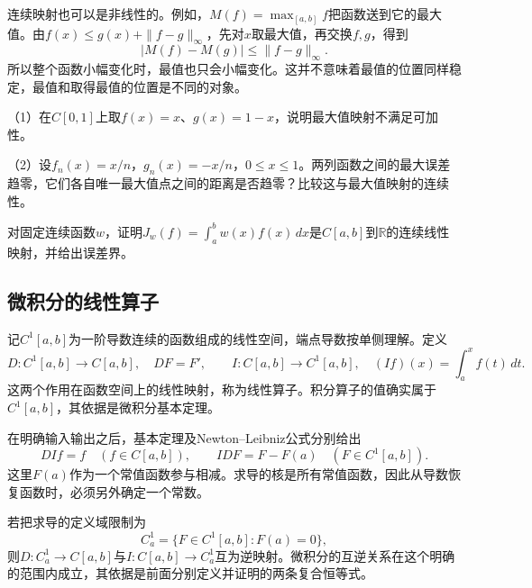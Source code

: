 连续映射也可以是非线性的。例如，\(M(f)=\max_{[a,b]}f\)把函数送到它的最大值。由\(f(x)\le g(x)+\|f-g\|_\infty\)，先对\(x\)取最大值，再交换\(f,g\)，得到
\begin{equation*}
 |M(f)-M(g)|\le\|f-g\|_\infty.
\end{equation*}
所以整个函数小幅变化时，最值也只会小幅变化。这并不意味着最值的位置同样稳定，最值和取得最值的位置是不同的对象。

\begin{exercise}
\mbox{}\par\nobreak

（1）在\(C[0,1]\)上取\(f(x)=x\)、\(g(x)=1-x\)，说明最大值映射不满足可加性。

（2）设\(f_n(x)=x/n\)，\(g_n(x)=-x/n\)，\(0\le x\le1\)。两列函数之间的最大误差趋零，它们各自唯一最大值点之间的距离是否趋零？比较这与最大值映射的连续性。
\end{exercise}

\begin{example}
对固定连续函数\(w\)，证明\(J_w(f)=\int_a^bw(x)f(x)\,dx\)是\(C[a,b]\)到\(\mathbb R\)的连续线性映射，并给出误差界。
\end{example}

\subsection{微积分的线性算子}

记\(C^1[a,b]\)为一阶导数连续的函数组成的线性空间，端点导数按单侧理解。定义
\begin{equation*}
 D:C^1[a,b]\to C[a,b],\quad DF=F',\qquad
 I:C[a,b]\to C^1[a,b],\quad(If)(x)=\int_a^xf(t)\,dt.
\end{equation*}
这两个作用在函数空间上的线性映射，称为{\heiti{}线性算子}。积分算子的值确实属于\(C^1[a,b]\)，其依据是微积分基本定理。

在明确输入输出之后，基本定理及Newton--Leibniz公式分别给出
\begin{equation*}
 DIf=f\quad(f\in C[a,b]),\qquad
 IDF=F-F(a)\quad(F\in C^1[a,b]).
\end{equation*}
这里\(F(a)\)作为一个常值函数参与相减。求导的核是所有常值函数，因此从导数恢复函数时，必须另外确定一个常数。

若把求导的定义域限制为
\begin{equation*}
 C^1_a=\{F\in C^1[a,b]:F(a)=0\},
\end{equation*}
则\(D:C^1_a\to C[a,b]\)与\(I:C[a,b]\to C^1_a\)互为逆映射。微积分的互逆关系在这个明确的范围内成立，其依据是前面分别定义并证明的两条复合恒等式。

